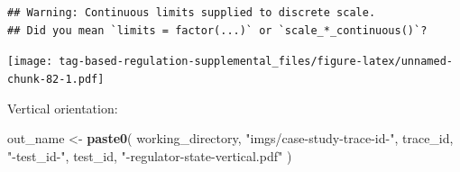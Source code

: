 \documentclass[]{book}
\newenvironment{Shaded}{\begin{snugshade}}{\end{snugshade}}
\newcommand{\KeywordTok}[1]{\textcolor[rgb]{0.13,0.29,0.53}{\textbf{#1}}}
\newcommand{\NormalTok}[1]{#1}
\newcommand{\StringTok}[1]{\textcolor[rgb]{0.31,0.60,0.02}{#1}}
\begin{document}
\begin{verbatim}
## Warning: Continuous limits supplied to discrete scale.
## Did you mean `limits = factor(...)` or `scale_*_continuous()`?
\end{verbatim}

\texttt{[image: tag-based-regulation-supplemental\_files/figure-latex/unnamed-chunk-82-1.pdf]}

Vertical orientation:

\begin{Shaded}
\begin{Highlighting}[]
\NormalTok{out_name <-}\StringTok{ }\KeywordTok{paste0}\NormalTok{(}
\NormalTok{  working_directory,}
  \StringTok{"imgs/case-study-trace-id-"}\NormalTok{,}
\NormalTok{   trace_id,}
   \StringTok{"-test_id-"}\NormalTok{,}
\NormalTok{   test_id,}
   \StringTok{"-regulator-state-vertical.pdf"}
\NormalTok{)}


\end{Highlighting}
\end{Shaded}
\end{document}
